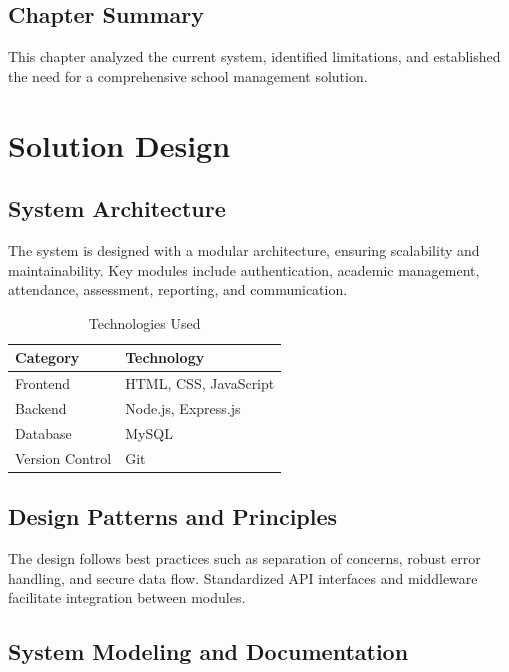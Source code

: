 \documentclass[12pt,a4paper]{report}
\begin{document}
\section{Chapter Summary}
This chapter analyzed the current system, identified limitations, and established the need for a comprehensive school management solution.

\chapter{Solution Design}
\section{System Architecture}
The system is designed with a modular architecture, ensuring scalability and maintainability. Key modules include authentication, academic management, attendance, assessment, reporting, and communication.

\begin{table}[htbp]
    \centering
    \caption{Technologies Used}
    \label{tab:tech-stack}
    \begin{tabular}{ll}
        \toprule
        Category & Technology \\
        \midrule
        Frontend & HTML, CSS, JavaScript \\
        Backend & Node.js, Express.js \\
        Database & MySQL \\
        Version Control & Git \\
        \bottomrule
    \end{tabular}
\end{table}

\section{Design Patterns and Principles}
The design follows best practices such as separation of concerns, robust error handling, and secure data flow. Standardized API interfaces and middleware facilitate integration between modules.

\section{System Modeling and Documentation}
\end{document}
